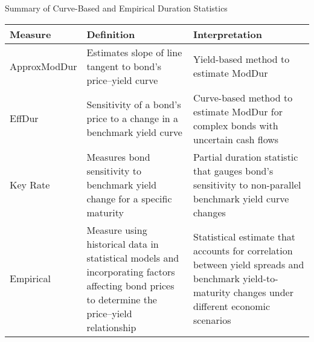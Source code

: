 \begin{flushleft}
Summary of Curve-Based and Empirical Duration Statistics
\begin{tabularx}{\textwidth}{p{7em}|X|X}
\hline
\rowcolor{gray!30}
Measure & Definition & Interpretation \\
\hline
ApproxModDur & Estimates slope of line tangent to bond’s price–yield curve & Yield-based method to estimate ModDur \\
\hline
EffDur & Sensitivity of a bond’s price to a change in a benchmark yield curve & Curve-based method to estimate ModDur for complex bonds with uncertain cash flows \\
\hline
Key Rate & Measures bond sensitivity to benchmark yield change for a specific maturity & Partial duration statistic that gauges bond’s sensitivity to non-parallel benchmark yield curve changes \\
\hline
Empirical & Measure using historical data in statistical models and incorporating factors affecting bond prices to determine the price–yield relationship & Statistical estimate that accounts for correlation between yield spreads and benchmark yield-to-maturity changes under different economic scenarios \\
\hline
\end{tabularx}
\end{flushleft}